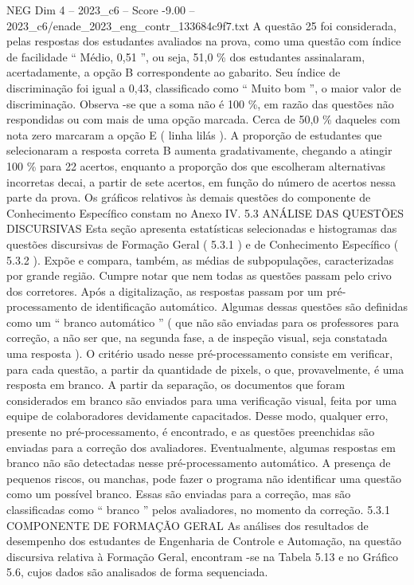 \begin{textsample}{NEG Dim 4 – 2023\_c6 – Score -9.00 – 2023\_c6/enade\_2023\_eng\_contr\_133684c9f7.txt}
A questão 25 foi considerada, pelas respostas dos estudantes avaliados na prova, como uma questão com índice de facilidade “ Médio, 0,51 ”, ou seja, 51,0 \% dos estudantes assinalaram, acertadamente, a opção B correspondente ao gabarito.
Seu índice de discriminação foi igual a 0,43, classificado como “ Muito bom ”, o maior valor de discriminação.
Observa -se que a soma não é 100 \%, em razão das questões não respondidas ou com mais de uma opção marcada.
Cerca de 50,0 \% daqueles com nota zero marcaram a opção E ( linha lilás ).
A proporção de estudantes que selecionaram a resposta correta B aumenta gradativamente, chegando a atingir 100 \% para 22 acertos, enquanto a proporção dos que escolheram alternativas incorretas decai, a partir de sete acertos, em função do número de acertos nessa parte da prova.
Os gráficos relativos às demais questões do componente de Conhecimento Específico constam no Anexo IV. 5.3 ANÁLISE DAS QUESTÕES DISCURSIVAS Esta seção apresenta estatísticas selecionadas e histogramas das questões discursivas de Formação Geral ( 5.3.1 ) e de Conhecimento Específico ( 5.3.2 ).
Expõe e compara, também, as médias de subpopulações, caracterizadas por grande região.
Cumpre notar que nem todas as questões passam pelo crivo dos corretores.
Após a digitalização, as respostas passam por um pré-processamento de identificação automático.
Algumas dessas questões são definidas como um “ branco automático ” ( que não são enviadas para os professores para correção, a não ser que, na segunda fase, a de inspeção visual, seja constatada uma resposta ).
O critério usado nesse pré-processamento consiste em verificar, para cada questão, a partir da quantidade de pixels, o que, provavelmente, é uma resposta em branco.
A partir da separação, os documentos que foram considerados em branco são enviados para uma verificação visual, feita por uma equipe de colaboradores devidamente capacitados.
Desse modo, qualquer erro, presente no pré-processamento, é encontrado, e as questões preenchidas são enviadas para a correção dos avaliadores.
Eventualmente, algumas respostas em branco não são detectadas nesse pré-processamento automático.
A presença de pequenos riscos, ou manchas, pode fazer o programa não identificar uma questão como um possível branco.
Essas são enviadas para a correção, mas são classificadas como “ branco ” pelos avaliadores, no momento da correção. 5.3.1 COMPONENTE DE FORMAÇÃO GERAL As análises dos resultados de desempenho dos estudantes de Engenharia de Controle e Automação, na questão discursiva relativa à Formação Geral, encontram -se na Tabela 5.13 e no Gráfico 5.6, cujos dados são analisados de forma sequenciada.

\end{textsample}
